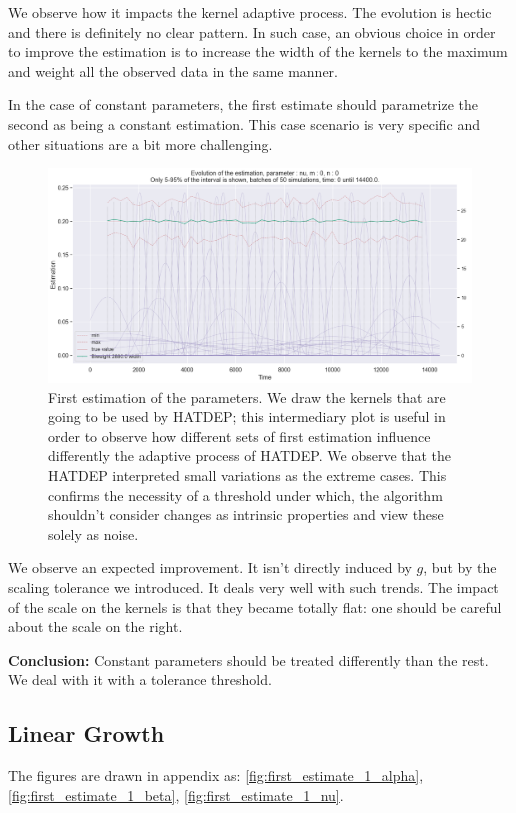 We observe how it impacts the kernel adaptive process. The evolution is hectic and there is definitely no clear pattern. In such case, an obvious choice in order to improve the estimation is to increase the width of the kernels to the maximum and weight all the observed data in the same manner. 

In the case of constant parameters, the first estimate should parametrize the second as being a constant estimation. This case scenario is very specific and other situations are a bit more challenging.

\begin{figure}
\centering
\includegraphics[width = 0.90 \textwidth]{../imag/chap3/IMPACT_G/flat_all_kernels.png}
\caption{First estimation of the parameters. We draw the kernels that are going to be used by HATDEP; this intermediary plot is useful in order to observe how different sets of first estimation influence differently the adaptive process of HATDEP. We observe that the HATDEP interpreted small variations as the extreme cases. This confirms the necessity of a threshold under which, the algorithm shouldn't consider changes as intrinsic properties and view these solely as noise.}
\label{fig:impact_g_flat}
\end{figure}


We observe an expected improvement. It isn't directly induced by $g$, but by the scaling tolerance we introduced. It deals very well with such trends. The impact of the scale on the kernels is that they became totally flat: one should be careful about the scale on the right.

\textbf{Conclusion:} Constant parameters should be treated differently than the rest. We deal with it with a tolerance threshold.




\subsection{Linear Growth}
The figures are drawn in appendix as: \ref{fig:first_estimate_1_alpha}, \ref{fig:first_estimate_1_beta}, \ref{fig:first_estimate_1_nu}.

